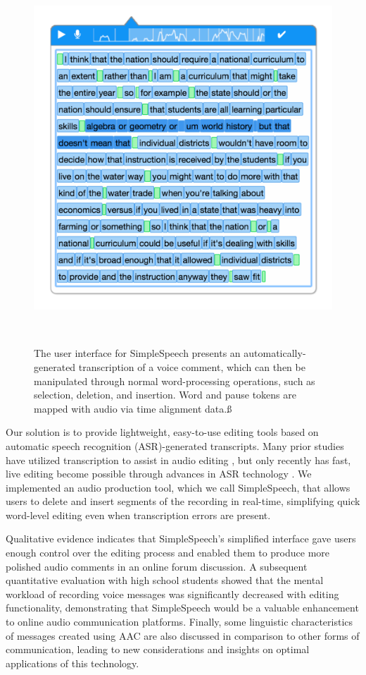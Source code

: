 \begin{figure}
	\centering
	\includegraphics[width=\columnwidth,keepaspectratio]{figures/large_screenshot}
	\caption{The user interface for SimpleSpeech presents an automatically-generated transcription of a voice comment, which can then be manipulated through normal word-processing operations, such as selection, deletion, and insertion. Word and pause tokens are mapped with audio via time alignment data.ß}~\label{fig:overview_shot}
\end{figure}

Our solution is to provide lightweight, easy-to-use editing tools based on automatic speech recognition (ASR)-generated transcripts.
Many prior studies have utilized transcription to assist in audio editing \cite{casares,rubin,whittaker_semantic}, but only recently has fast, live editing become possible through advances in ASR technology \cite{baker,saon}.
We implemented an audio production tool, which we call SimpleSpeech, that allows users to delete and insert segments of the recording in real-time, simplifying quick word-level editing even when transcription errors are present.

Qualitative evidence indicates that SimpleSpeech's simplified interface gave users enough control over the editing process and enabled them to produce more polished audio comments in an online forum discussion.
A subsequent quantitative evaluation with high school students showed that the mental workload of recording voice messages was significantly decreased with editing functionality, demonstrating that SimpleSpeech would be a valuable enhancement to online audio communication platforms.
Finally, some linguistic characteristics of messages created using AAC are also discussed in comparison to other forms of communication, leading to new considerations and insights on optimal applications of this technology.